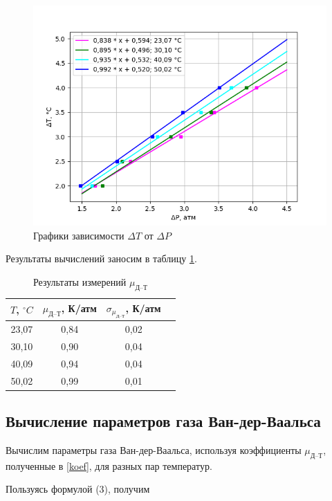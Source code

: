 \documentclass[12pt,a4paper]{article}
\begin{document}
 \begin{figure}[h!]
    \centering
    \includegraphics[scale=0.8]{plot.png}
	\caption{Графики зависимости $ \Delta T $ от $ \Delta P $}
	\label{ris}
\end{figure}

Результаты вычислений заносим в таблицу \ref{tab:my-table}.
\label{koef}
\begin{table}[h]
	\centering
	\begin{tabular}{|c|c|c|c|}
		\hline
		$ T $, $ ^\circ C $ & $ \mu_\text{Д--Т} $, К/атм & $ \sigma_{\mu_\text{Д--Т}} $, К/атм \\ \hline
		23,07 & 0,84 & 0,02 \\ \hline
		30,10 & 0,90 & 0,04 \\ \hline
		40,09 & 0,94 & 0,04 \\ \hline
		50,02 & 0,99 & 0,01 \\ \hline
		
	\end{tabular}
	\caption{Результаты измерений $ \mu_\text{Д--Т} $}
	\label{tab:my-table}
\end{table}

\subsection{Вычисление параметров газа Ван-дер-Ваальса}

Вычислим параметры газа Ван-дер-Ваальса, используя коэффициенты $ \mu_\text{Д--Т} $, полученные в \ref{koef}, для разных пар температур.

Пользуясь формулой (3), получим 
\end{document}
